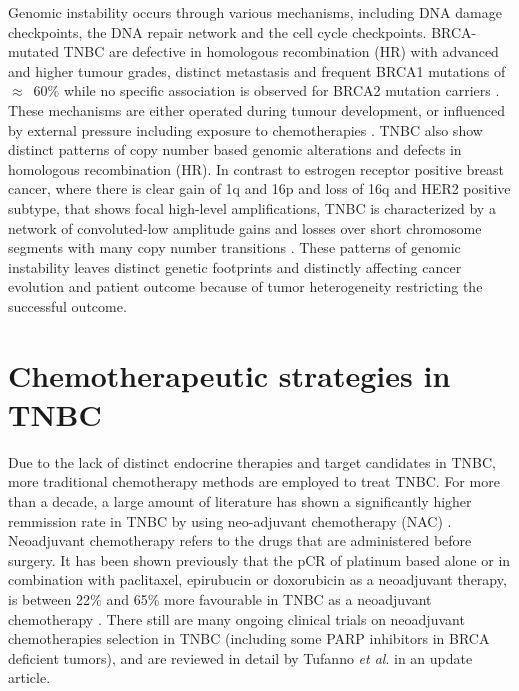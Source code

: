 Genomic instability occurs through various mechanisms, including DNA damage checkpoints, the DNA repair network and the cell cycle checkpoints. BRCA-mutated TNBC are defective in homologous recombination (HR) with advanced and higher tumour grades, distinct metastasis and frequent BRCA1 mutations of $\approx$~60\% while no specific association is observed for BRCA2 mutation carriers \cite{boyle2012triple, atchley2008clinical}. These mechanisms are either operated during tumour development, or influenced by external pressure including exposure to chemotherapies \cite{burrell2013causes,ding2012clonal,hunter2006hypermutation}.
TNBC also show distinct patterns of copy number based genomic alterations and defects in homologous recombination (HR). In contrast to estrogen receptor positive breast cancer, where there is clear gain of 1q and 16p and loss of 16q and HER2 positive subtype, that shows focal high-level amplifications, TNBC is characterized by a network of convoluted-low amplitude gains and losses over short chromosome segments with many copy number transitions \cite{kwei2010genomic}. These patterns of genomic instability leaves distinct genetic footprints and distinctly affecting cancer evolution and patient outcome because of tumor heterogeneity restricting the successful outcome. 


\section{Chemotherapeutic strategies in TNBC}
Due to the lack of distinct endocrine therapies and target candidates in TNBC, more traditional chemotherapy methods are employed to treat TNBC. For more than a decade, a large amount of literature has shown a significantly higher remmission rate in TNBC by using neo-adjuvant chemotherapy (NAC) \cite{liedtke2008response,symmans2017long}. Neoadjuvant chemotherapy refers to the drugs that are administered before surgery. It has been shown previously that the \ac{pCR} of platinum based alone or in combination with paclitaxel, epirubucin or doxorubicin as a neoadjuvant therapy, is between 22\% and 65\% 
more favourable in TNBC as a neoadjuvant chemotherapy \cite{silver2010efficacy,petrelli2014value,garber2006neo,frasci2009preoperative}. There still are many ongoing clinical trials on neoadjuvant chemotherapies selection in TNBC (including some PARP inhibitors in BRCA deficient tumors), and are reviewed in detail by Tufanno \textit{et al}. \cite{tufano2020updates} in an update article.


